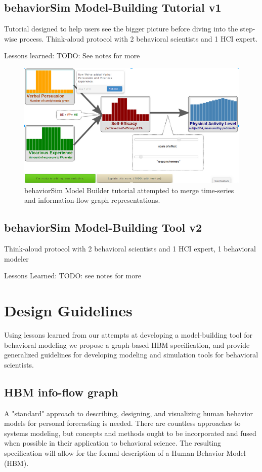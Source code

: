 \documentclass[conference]{IEEEtran}
\begin{document}
\subsection{behaviorSim Model-Building Tutorial v1}
Tutorial designed to help users see the bigger picture before diving into the step-wise process.
Think-aloud protocol with 2 behavioral scientists and 1 HCI expert. 




Lessons learned:
  TODO: See notes for more
 
\begin{figure}[!t]
  \centering
  \includegraphics[width=0.9\columnwidth]{img/v1-flow}  
  \caption{behaviorSim Model Builder tutorial attempted to merge time-series and information-flow graph representations.}
  \label{model-builder-tutorial}
\end{figure}

\subsection{behaviorSim Model-Building Tool v2}
Think-aloud protocol with 2 behavioral scientists and 1 HCI expert, 1 behavioral modeler

Lessons Learned:
  TODO: see notes for more
  


  
\section{Design Guidelines}
Using lessons learned from our attempts at developing a model-building tool for behavioral modeling we propose a graph-based HBM specification, and provide generalized guidelines for developing modeling and simulation tools for behavioral scientists.

\subsection{HBM info-flow graph}
A "standard" approach to describing, designing, and visualizing human behavior models for personal forecasting is needed.
There are countless approaches to systems modeling, but concepts and methods ought to be incorporated and fused when possible in their application to behavioral science.
The resulting specification will allow for the formal description of a Human Behavior Model (HBM).
\end{document}
